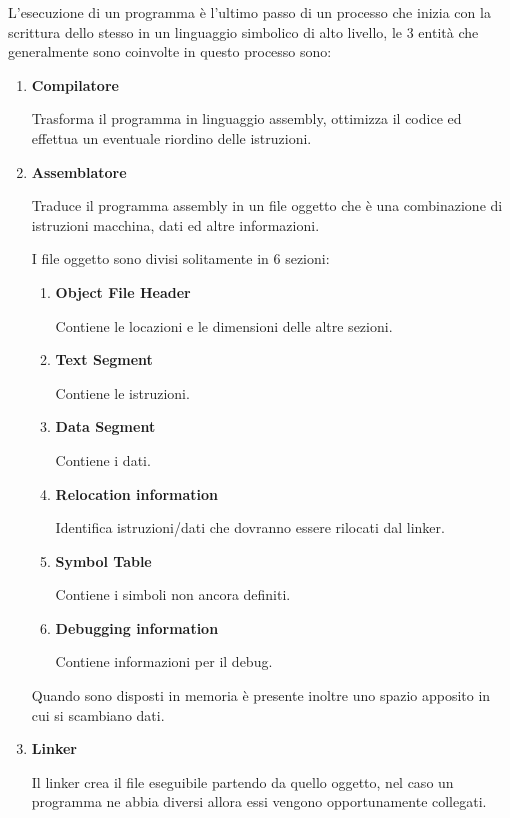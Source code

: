 \documentclass{article}
\begin{document}
L'esecuzione di un programma è l'ultimo passo di un processo che inizia con la scrittura dello stesso in un linguaggio simbolico di alto livello, le 3 entità che generalmente sono coinvolte in questo processo sono:
\begin{enumerate}
    \item \textbf{Compilatore}

        Trasforma il programma in linguaggio assembly, ottimizza il codice ed effettua un eventuale riordino delle istruzioni.
    
    \item \textbf{Assemblatore}

        Traduce il programma assembly in un file oggetto che è una combinazione di istruzioni macchina, dati ed altre informazioni.

        \newpage

        I file oggetto sono divisi solitamente in 6 sezioni:
        \begin{enumerate}
            \item \textbf{Object File Header}

                Contiene le locazioni e le dimensioni delle altre sezioni.

            \item \textbf{Text Segment}

                Contiene le istruzioni.

            \item \textbf{Data Segment}

                Contiene i dati.

            \item \textbf{Relocation information}

                Identifica istruzioni/dati che dovranno essere rilocati dal linker.

            \item \textbf{Symbol Table}

                Contiene i simboli non ancora definiti.

            \item \textbf{Debugging information}

                Contiene informazioni per il debug.
            
        \end{enumerate}

        Quando sono disposti in memoria è presente inoltre uno spazio apposito in cui si scambiano dati.
    
    \item \textbf{Linker}

        Il linker crea il file eseguibile partendo da quello oggetto, nel caso un programma ne abbia diversi allora essi vengono opportunamente collegati.\newline
    
\end{enumerate}
\end{document}
